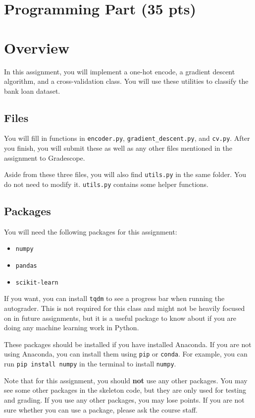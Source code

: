 \documentclass{article}
\begin{document}
\section*{Programming Part (35 pts)}


\section*{Overview}

In this assignment, you will implement a one-hot encode, a gradient descent algorithm, and a cross-validation class. You will use these utilities to classify the bank loan dataset.


\subsection*{Files}
You will fill in functions in \verb|encoder.py|, \verb|gradient_descent.py|, and \verb|cv.py|. After you finish, you will submit these as well as any other files mentioned in the assignment to Gradescope.

Aside from these three files, you will also find \verb|utils.py| in the same folder. You do not need to modify it. \verb|utils.py| contains some helper functions.
\subsection*{Packages}
You will need the following packages for this assignment:
\begin{itemize}
    \item \verb|numpy|
    \item \verb|pandas|
    \item \verb|scikit-learn|
\end{itemize}

If you want, you can install \verb|tqdm| to see a progress bar when running the autograder. This is not
required for this class and might not be heavily focused on in future assignments, but it is a useful
package to know about if you are doing any machine learning work in Python.

These packages should be installed if you have installed Anaconda. If you are not using Anaconda,
you can install them using \verb|pip| or \verb|conda|. For example, you can run \verb|pip install numpy| in the terminal to
install \verb|numpy|.

Note that for this assignment, you should \textbf{not} use any other packages. You may see some other
packages in the skeleton code, but they are only used for testing and grading. If you use any other
packages, you may lose points. If you are not sure whether you can use a package, please ask the
course staff.
\end{document}
